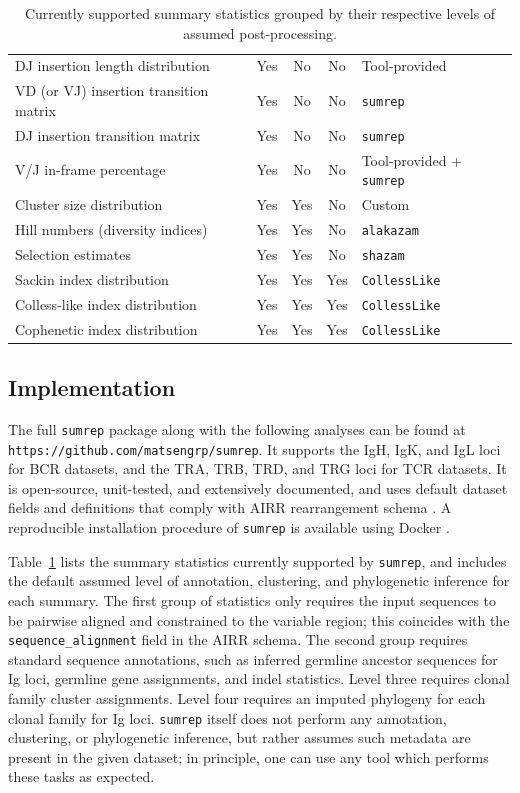 \documentclass{article}
\begin{document}
\begin{table}
{\begin{tabular}{l|c|c|c|l}
DJ insertion length distribution & Yes & No & No & Tool-provided \\
VD (or VJ) insertion transition matrix & Yes & No & No & \texttt{sumrep} \\
DJ insertion transition matrix & Yes & No & No & \texttt{sumrep} \\
V/J in-frame percentage & Yes & No & No & Tool-provided + \texttt{sumrep} \\
\hline
Cluster size distribution & Yes & Yes & No & Custom \\
Hill numbers (diversity indices) & Yes & Yes & No & \texttt{alakazam} \\
Selection estimates & Yes & Yes & No & \texttt{shazam} \\
\hline
    Sackin index distribution & Yes & Yes & Yes & \texttt{CollessLike} \cite{Mir2018-lk} \\
Colless-like index distribution & Yes & Yes & Yes & \texttt{CollessLike} \\
Cophenetic index distribution & Yes & Yes & Yes & \texttt{CollessLike} \\
\end{tabular}
}
\caption{Currently supported summary statistics grouped by their respective levels of assumed post-processing.}
\label{tab:SummaryStatistics}
\end{table}

\subsection*{Implementation}
The full \texttt{sumrep} package along with the following analyses can be found at \texttt{https://github.com/matsengrp/sumrep}.
It supports the IgH, IgK, and IgL loci for BCR datasets, and the TRA, TRB, TRD, and TRG loci for TCR datasets.
It is open-source, unit-tested, and extensively documented, and uses default dataset fields and definitions that comply with AIRR rearrangement schema \cite{Vander_Heiden2018-mu}.
A reproducible installation procedure of \texttt{sumrep} is available using Docker \cite{Boettiger2015-ya}.

Table~\ref{tab:SummaryStatistics} lists the summary statistics currently supported by \texttt{sumrep}, and includes the default assumed level of annotation, clustering, and phylogenetic inference for each summary.
The first group of statistics only requires the input sequences to be pairwise aligned and constrained to the variable region; this coincides with the \texttt{sequence\_alignment} field in the AIRR schema.
The second group requires standard sequence annotations, such as inferred germline ancestor sequences for Ig loci, germline gene assignments, and indel statistics.
Level three requires clonal family cluster assignments.
Level four requires an imputed phylogeny for each clonal family for Ig loci.
\texttt{sumrep} itself does not perform any annotation, clustering, or phylogenetic inference, but rather assumes such metadata are present in the given dataset; in principle, one can use any tool which performs these tasks as expected.
\end{document}
